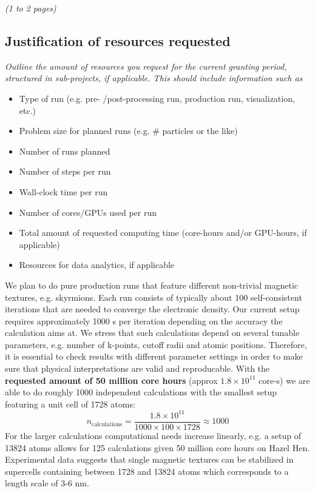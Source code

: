 \documentclass [a4paper, 12pt]{article}
\begin{document}
\textit{(1 to 2 pages)}
\newpage
\subsection{Justification of resources requested}
\textit{Outline the amount of resources you request for the current granting period, structured in sub-projects, if applicable. This should include information such as}
\begin{itshape}
\begin{itemize}\setlength{\itemsep}{-2pt}
    \item Type of run (e.g. pre- /post-processing run, production run, visualization, etc.)

    \item Problem size for planned runs (e.g. \# particles or the like)
    \item Number of runs planned
    \item Number of steps per run
    \item Wall-clock time per run
    \item Number of cores/GPUs used per run
    \item Total amount of requested computing time (core-hours and/or GPU-hours, if applicable)
    \item Resources for data analytics, if applicable
\end{itemize}
\end{itshape}

We plan to do pure production runs that feature different non-trivial magnetic textures, e.g. skyrmions.
Each run consists of typically about 100 self-consistent iterations that are needed to converge
the electronic density. Our current setup requires approximately 1000 s per iteration depending on the accuracy
the calculation aims at. We stress that such calculations depend on several tunable parameters, e.g. number of
k-points, cutoff radii and atomic positions. Therefore, it is essential to check results with different parameter
settings in order to make sure that physical interpretations are valid and reproducable. 
With the \textbf{requested amount of 50 million core hours} (approx $1.8 \times 10^{11}$ core-s)
we are able to do roughly 1000 independent calculations with
the smallest setup featuring a unit cell of 1728 atoms:
\begin{equation}
	n_{\text{calculations}} = \frac{1.8 \times 10^{11} }{ 1000 \times 100 \times 1728} \approx 1000 
\end{equation}
For the larger calculations computational needs increase linearly, e.g. a setup of
13824 atoms allows for 125 calculations given 50 million core hours on Hazel Hen.
Experimental data suggests that single magnetic textures can be stabilized in supercells containing between
1728 and 13824 atoms which corresponds to a length scale of 3-6 nm.
\end{document}
